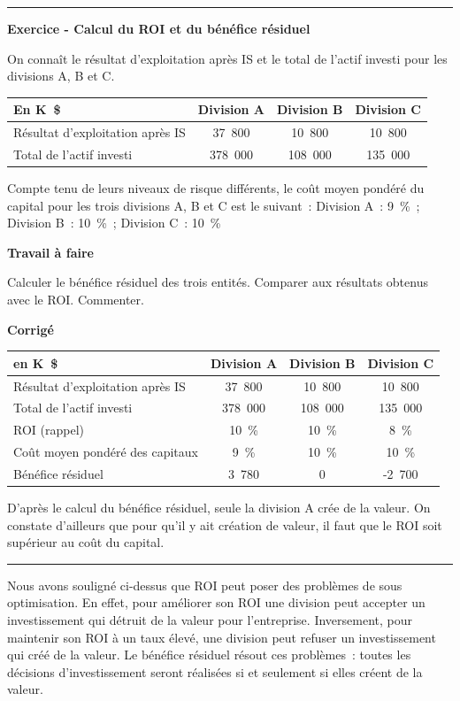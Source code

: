 \documentclass[oneside]{kaobook}
\begin{document}
\noindent\rule{\textwidth}{0.5pt}
\textbf{Exercice -  Calcul du ROI et du bénéfice résiduel}

On connaît le résultat d'exploitation après IS et le total de l'actif investi pour les divisions A, B et C.
\begin{center}
\sidenotesize
\begin{tabular}{l c c c}
En K \$ & Division A & Division B & Division C\\
\hline
Résultat d'exploitation après IS & 37 800 & 10 800 & 10 800\\
Total de l'actif investi & 378 000 & 108 000 & 135 000\\
\end{tabular}
\end{center}
Compte tenu de leurs niveaux de risque différents, le coût moyen pondéré
du capital pour les trois divisions A, B et C est le suivant : Division
A : 9 \% ; Division B : 10 \% ; Division C : 10 \%

\textbf{Travail à faire}

Calculer le bénéfice résiduel des trois entités. Comparer aux résultats
obtenus avec le ROI. Commenter.

\textbf{Corrigé}

\begin{center}
\sidenotesize
\begin{tabular}{l c c c}
en K \$ & Division A & Division B & Division C\\
\hline
Résultat d'exploitation après IS & 37 800 & 10 800 & 10 800\\
Total de l'actif investi & 378 000 & 108 000 & 135 000\\
ROI (rappel) & 10 \% & 10 \% & 8 \%\\
Coût moyen pondéré des capitaux & 9 \% & 10 \% & 10 \%\\
Bénéfice résiduel & 3 780 & 0 & -2 700\\
\end{tabular}
\end{center}
D'après le calcul du bénéfice résiduel, seule la division A crée de la valeur. On constate d'ailleurs que pour qu'il y ait création de valeur, il faut que le ROI soit supérieur au coût du capital. 

\noindent\rule{\textwidth}{0.5pt}

Nous avons souligné ci-dessus que ROI peut poser des problèmes de sous optimisation. En effet, pour améliorer son ROI une division peut accepter un investissement qui détruit de la valeur pour l'entreprise. Inversement, pour maintenir son ROI à un taux élevé, une division peut refuser un investissement qui créé de la valeur. Le bénéfice résiduel résout ces problèmes : toutes les décisions d'investissement seront réalisées si et seulement si elles créent de la valeur.
\end{document}
